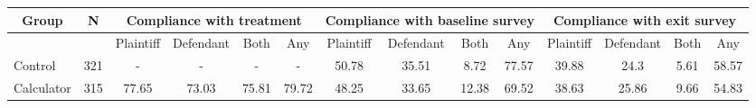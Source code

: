 \begin{tabular}{lrcccccccccccc}
\toprule
\multicolumn{1}{c}{Group} & \multicolumn{1}{c}{N} & \multicolumn{4}{c}{Compliance with treatment} & \multicolumn{4}{c}{Compliance with baseline survey} & \multicolumn{4}{c}{Compliance with exit survey} \\
\midrule
\midrule
      &       & Plaintiff & Defendant & Both  & Any   & Plaintiff & Defendant & Both  & Any   & Plaintiff & Defendant & Both  & Any \\
\midrule
Control & 321   & -     & -     & -     & -     & 50.78 & 35.51 & 8.72  & 77.57 & 39.88 & 24.3  & 5.61  & 58.57 \\
Calculator & 315   & 77.65 & 73.03 & 75.81 & 79.72 & 48.25 & 33.65 & 12.38 & 69.52 & 38.63 & 25.86 & 9.66  & 54.83 \\
\bottomrule
\end{tabular}%
